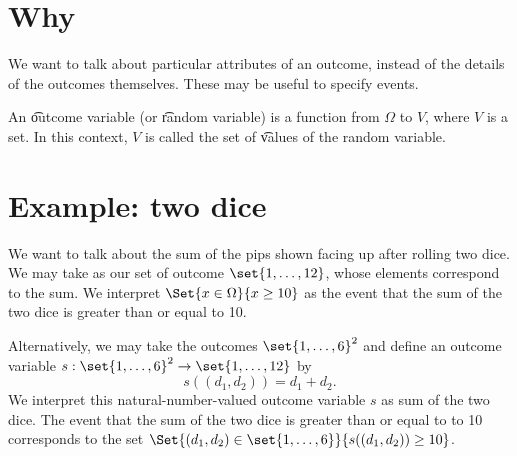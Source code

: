 
\section*{Why}

We want to talk about particular attributes of an outcome, instead of the details of the outcomes themselves.
These may be useful to specify events.

An \t{outcome variable} (or \t{random variable}) is a function from $\Omega $ to $V$, where $V$ is a set.
In this context, $V$ is called the set of \t{values} of the random variable.

\section*{Example: two dice}

We want to talk about the sum of the pips shown facing up after rolling two dice.
We may take as our set of outcome $\set{1, \dots , 12}$, whose elements correspond to the sum.
We interpret $\Set{x \in \Omega }{x \geq 10}$ as the event that the sum of the two dice is greater than or equal to 10.

Alternatively, we may take the outcomes $\set{1, \dots , 6}^2$ and define an outcome variable $s: \set{1, \dots , 6}^2 \to \set{1, \dots , 12}$ by
\[
s((d_1, d_2)) = d_1 + d_2.
\]
We interpret this natural-number-valued outcome variable $s$ as sum of the two dice.
The event that the sum of the two dice is greater than or equal to to 10 corresponds to the set $\Set{(d_1, d_2) \in \set{1, \dots , 6}}{s((d_1, d_2)) \geq 10}$.

\blankpage
